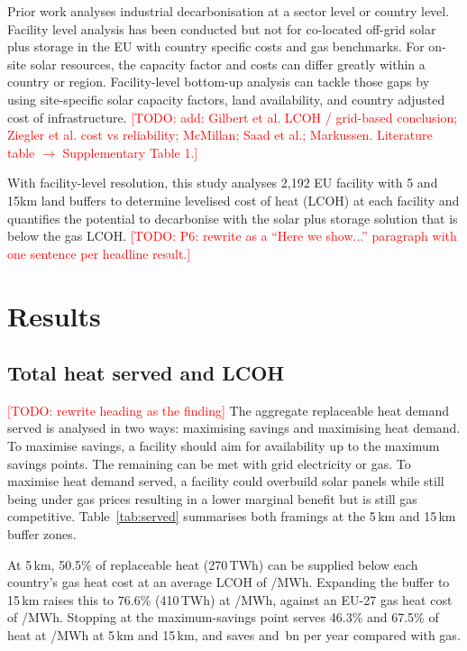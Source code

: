 \documentclass[11pt]{article}
\newcommand{\todo}[1]{\textcolor{red}{[TODO: #1]}}
\begin{document}
Prior work analyses industrial decarbonisation at a sector level or country level\cite{rosenow2025nrct,agora2026business}. Facility level analysis has been conducted but not for co-located off-grid solar plus storage in the EU with country specific costs and gas benchmarks\cite{chojkiewicz2026,hotmaps2018}. For on-site solar resources, the capacity factor and costs can differ greatly within a country or region. Facility-level bottom-up analysis can tackle those gaps\cite{neuwirth2024} by using site-specific solar capacity factors, land availability, and country adjusted cost of infrastructure.
\todo{add: Gilbert et al. LCOH / grid-based conclusion\cite{gilbert2023lcoh}; Ziegler et al. cost vs reliability\cite{ziegler2019storage}; McMillan; Saad et al.; Markussen. Literature table $\rightarrow$ Supplementary Table 1.}

With facility-level resolution, this study analyses 2,192 EU facility with 5 and 15km land buffers to determine levelised cost of heat (LCOH) at each facility and quantifies the potential to decarbonise with the solar plus storage solution that is below the gas LCOH.
\todo{P6: rewrite as a ``Here we show...'' paragraph with one sentence per headline result.}

\section*{Results}

\subsection*{Total heat served and LCOH}
\todo{rewrite heading as the finding}
The aggregate replaceable heat demand served is analysed in two ways: maximising savings and maximising heat demand. To maximise savings, a facility should aim for availability up to the maximum savings points. The remaining can be met with grid electricity or gas. To maximise heat demand served, a facility could overbuild solar panels while still being under gas prices resulting in a lower marginal benefit but is still gas competitive. Table~\ref{tab:served} summarises both framings at the 5\,km and 15\,km buffer zones.

At 5\,km, 50.5\% of replaceable heat (270\,TWh) can be supplied below each country's gas heat cost at an average LCOH of /MWh. Expanding the buffer to 15\,km raises this to 76.6\% (410\,TWh) at /MWh, against an EU-27 gas heat cost of /MWh. Stopping at the maximum-savings point serves 46.3\% and 67.5\% of heat at /MWh at 5\,km and 15\,km, and saves  and \,bn per year compared with gas.
\end{document}
